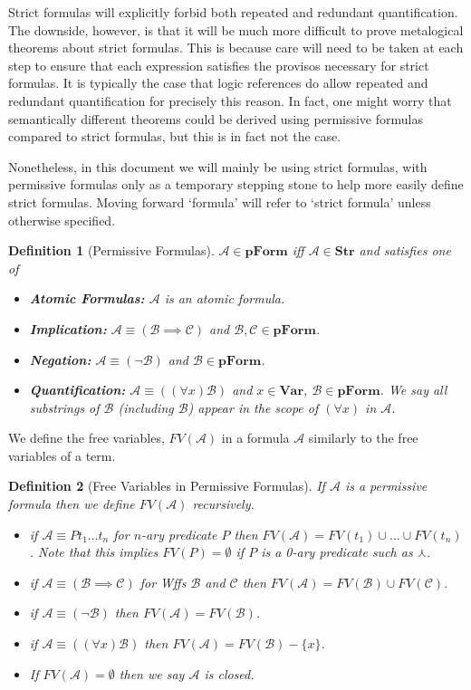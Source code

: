 \documentclass[12pt]{article}
\theoremstyle{break}
\newtheorem{definition}{Definition}[section]
\theoremstyle{break}
\theoremstyle{break}
\theoremstyle{break}
\newcommand{\mc}[1]{\mathcal{#1}}
\begin{document}
Strict formulas will explicitly forbid both repeated and redundant quantification.
The downside, however, is that it will be much more difficult to prove metalogical theorems about strict formulas.
This is because care will need to be taken at each step to ensure that each expression satisfies the provisos necessary for strict formulas.
It is typically the case that logic references do allow repeated and redundant quantification for precisely this reason.
In fact, one might worry that semantically different theorems could be derived using permissive formulas compared to strict formulas, but this is in fact not the case.

Nonetheless, in this document we will mainly be using strict formulas, with permissive formulas only as a temporary stepping stone to help more easily define strict formulas.
Moving forward `formula' will refer to `strict formula' unless otherwise specified.

\begin{definition}[Permissive Formulas]
$\mc{A} \in \textbf{pForm}$ iff $\mc{A} \in \textbf{Str}$ and satisfies one of 

\begin{itemize}
\item{\textbf{Atomic Formulas:} $\mc{A}$ is an atomic formula.}
\item{\textbf{Implication:} $\mc{A}\equiv (\mc{B}\implies \mc{C})$ and $\mc{B}, \mc{C} \in \textbf{pForm}$.}
\item{\textbf{Negation:} $\mc{A}\equiv (\lnot \mc{B})$ and $\mc{B} \in \textbf{pForm}$.}
\item{\textbf{Quantification:} $\mc{A}\equiv ((\forall x)\mc{B})$ and $x\in \textbf{Var}$, $\mc{B}\in \textbf{pForm}$. We say all substrings of $\mc{B}$ (including $\mc{B}$) appear in the scope of $(\forall x)$ in $\mc{A}$.} 
\end{itemize}
\end{definition}

We define the free variables, $FV(\mc{A})$ in a formula $\mc{A}$ similarly to the free variables of a term.

\begin{definition}[Free Variables in Permissive Formulas]
If $\mc{A}$ is a permissive formula then we define $FV(\mc{A})$ recursively.
\begin{itemize}
\item{if $\mc{A} \equiv Pt_1\ldots t_n$ for $n$-ary predicate $P$ then $FV(\mc{A}) = FV(t_1)\cup\ldots\cup FV(t_n)$. Note that this implies $FV(P)=\emptyset$ if $P$ is a 0-ary predicate such as $\curlywedge$.}
\item{if $\mc{A} \equiv (\mc{B}\implies \mc{C})$ for Wffs $\mc{B}$ and $\mc{C}$ then $FV(\mc{A}) = FV(\mc{B})\cup FV(\mc{C})$.}
\item{if $\mc{A} \equiv (\lnot\mc{B})$ then $FV(\mc{A}) = FV(\mc{B})$.}
\item{if $\mc{A} \equiv ((\forall x)\mc{B})$ then $FV(\mc{A}) = FV(\mc{B}) - \{x\}$.}
\item{If $FV(\mc{A}) = \emptyset$ then we say $\mc{A}$ is closed.}
\end{itemize}
\end{definition}
\end{document}
